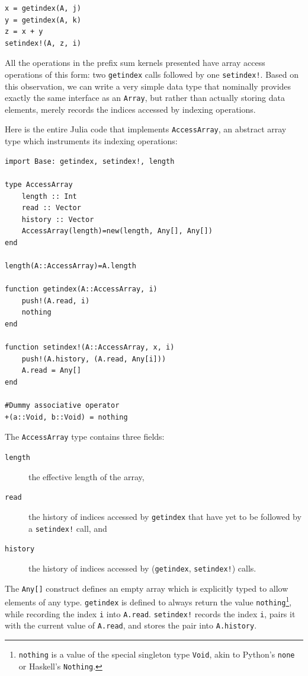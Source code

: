 \documentclass{sig-alternate}
\newcommand{\code}[1]{\texttt{#1}}
\begin{document}
\begin{verbatim}
x = getindex(A, j)
y = getindex(A, k)
z = x + y
setindex!(A, z, i)
\end{verbatim}

All the operations in the prefix sum kernels presented have array access
operations of this form: two \code{getindex} calls followed by one
\code{setindex!}. Based on this observation, we can write a very simple data
type that nominally provides exactly the same interface as an \code{Array}, but
rather than actually storing data elements, merely records the indices accessed
by indexing operations.

Here is the entire Julia code that implements \code{AccessArray}, an abstract
array type which instruments its indexing operations:

\begin{verbatim}
import Base: getindex, setindex!, length

type AccessArray
    length :: Int
    read :: Vector
    history :: Vector
    AccessArray(length)=new(length, Any[], Any[])
end

length(A::AccessArray)=A.length

function getindex(A::AccessArray, i)
    push!(A.read, i)
    nothing
end

function setindex!(A::AccessArray, x, i)
    push!(A.history, (A.read, Any[i]))
    A.read = Any[]
end

#Dummy associative operator
+(a::Void, b::Void) = nothing
\end{verbatim}
%
The \code{AccessArray} type contains three fields:

\begin{description}
	\item[\code{length}] the effective length of the array,
	\item[\code{read}] the history of indices accessed by \code{getindex}
		that have yet to be followed by a \code{setindex!} call, and
	\item[\code{history}] the history of indices accessed by
		(\code{getindex}, \code{set\-index!}) calls.
\end{description}
%
The \code{Any[]} construct defines an empty array which is explicitly typed to
allow elements of any type. \code{getindex} is defined to always return the value
\code{nothing}\footnote{\code{nothing} is a value of the special
singleton type \code{Void}, akin to Python's \code{none} or Haskell's
\code{Nothing}.}, while recording the index \code{i} into \code{A.read}.
\code{setindex!} records the index \code{i}, pairs it with the current value of
\code{A.read}, and stores the pair into \code{A.history}.
\end{document}
